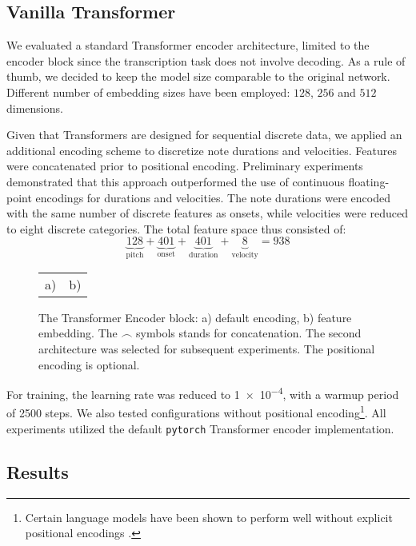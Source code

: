 \subsection{Vanilla Transformer}

We evaluated a standard Transformer encoder architecture, limited to the encoder block since the transcription task does not involve decoding. As a rule of thumb, we decided to keep the model size comparable to the original network. Different number of embedding sizes have been employed: $128$, $256$ and $512$ dimensions. 

Given that Transformers are designed for sequential discrete data, we applied an additional encoding scheme to discretize note durations and velocities. Features were concatenated prior to positional encoding. Preliminary experiments demonstrated that this approach outperformed the use of continuous floating-point encodings for durations and velocities. The note durations were encoded with the same number of discrete features as onsets, while velocities were reduced to eight discrete categories. The total feature space thus consisted of: \[\underbrace{128}_{\textrm{pitch}}+\underbrace{401}_{\textrm{onset}}+\underbrace{401}_{\textrm{duration}}+\underbrace{8}_{\textrm{velocity}} = 938\]

\begin{figure}[ht!]
\centering
\begin{tabular}{cc}a)
 & b)

\end{tabular}
\caption[The Transformer Encoder block.]{The Transformer Encoder block: a) default encoding, b) feature embedding. The $\frown$ symbols stands for concatenation. The second architecture was selected for subsequent experiments. The positional encoding is optional.}
\label{vanilla_transformer_encoder_with_embedding}
\end{figure}

For training, the learning rate was reduced to \num{1e-4}, with a warmup period of 2500 steps. We also tested configurations without positional encoding\footnote{Certain language models have been shown to perform well without explicit positional encodings \cite{Haviv2022}.}. All experiments utilized the default \texttt{pytorch} Transformer encoder implementation.

\subsection{Results}

